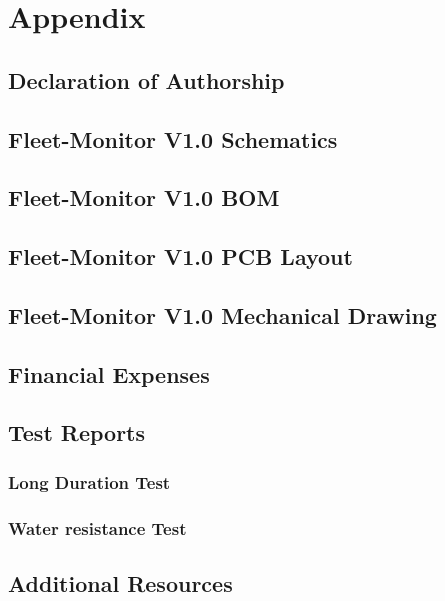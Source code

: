 \chapter{Appendix}
\section{Declaration of Authorship} \label{Declaration of Authorship}
\section{Fleet-Monitor V1.0 Schematics} \label{Fleet-Monitor V1.0 Schematics}
\section{Fleet-Monitor V1.0 BOM} \label{Fleet-Monitor V1.0 BOM}
\section{Fleet-Monitor V1.0 PCB Layout} \label{Fleet-Monitor V1.0 PCB Layout}
\section{Fleet-Monitor V1.0 Mechanical Drawing} \label{Fleet-Monitor V1.0 Mechanical Drawing}
\section{Financial Expenses} \label{Financial Expenses}
\section{Test Reports} \label{Test Reports}
\subsection{Long Duration Test} \label{Long Duration Test}
\subsection{Water resistance Test} \label{Water resistance Test}
\section{Additional Resources} \label{Additional Resources}